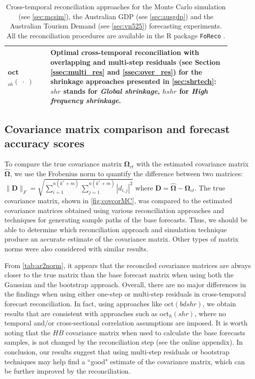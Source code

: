 \documentclass[12pt]{article}
\newcommand{\Dvet}{\bm{D}}
\newcommand{\Omegavet}{\bm{\Omega}}
\theoremstyle{definition}
\begin{document}
\begin{table}[!th]
{\begin{tabular}{M{0.175\linewidth}|L{0.725\linewidth}}
		\addlinespace[0.15cm]
		oct$_{oh}(\;\cdot\;)$ & Optimal cross-temporal reconciliation with overlapping and multi-step residuals (see Section \ref{ssec:multi_res} and \ref{ssec:over_res}) for the shrinkage approaches presented in \autoref{sec:shrtech}: $shr$ stands for \textit{Global shrinkage}, $hshr$ for \textit{High frequency shrinkage}.\\
		\bottomrule
	\end{tabular}}
	\caption{Cross-temporal reconciliation approaches for the Monte Carlo simulation (see \autoref{sec:mcsim}), the Australian GDP (see \autoref{sec:ausgdp}) and the Australian Tourism Demand (see \autoref{sec:vn525}) forecasting experiments. All the reconciliation procedures are available in the R package \texttt{FoReco} \citep{foreco2023}.}
	\label{tab:notation}
\end{table}

\subsection{Covariance matrix comparison and forecast accuracy scores}\label{ssec:acc_scores}

To compare the true covariance matrix $\Omegavet_{ct}$ with the estimated covariance matrix $\widehat{\Omegavet}$, we use the Frobenius norm to quantify the difference between two matrices: $\lVert \Dvet \rVert_F = \displaystyle\sqrt{\sum_{i = 1}^{n(k^\ast + m)}\sum_{j = 1}^{n(k^\ast + m)}|d_{i,j}|^2}$ where $\Dvet = \widehat{\Omegavet} - \Omegavet_{ct}$. The true covariance matrix, shown in \autoref{fig:covcorMC}, was compared to the estimated covariance matrices obtained using various reconciliation approaches and techniques for generating sample paths of the base forecasts. Thus, we should be able to determine which reconciliation approach and simulation technique produce an accurate estimate of the covariance matrix. Other types of matrix norms were also considered with similar results.

From \autoref{tab:ar2norm}, it appears that the reconciled covariance matrices are always closer to the true matrix than the base forecast matrix when using both the Gaussian and the bootstrap  approach. Overall, there are no major differences in the findings when using either one-step or multi-step residuals in cross-temporal forecast reconciliation. In fact, using approaches like oct$(bdshr)$, we obtain results that are consistent with approaches such as oct$_h(shr)$, where no temporal and/or cross-sectional correlation assumptions are imposed. It is worth noting that the $HB$ covariance matrix when used to calculate the base forecasts samples, is not changed by the reconciliation step (see the online appendix). In conclusion, our results suggest that using multi-step residuals or bootstrap techniques may help find a “good" estimate of the covariance matrix, which can be further improved by the reconciliation.
\end{document}
